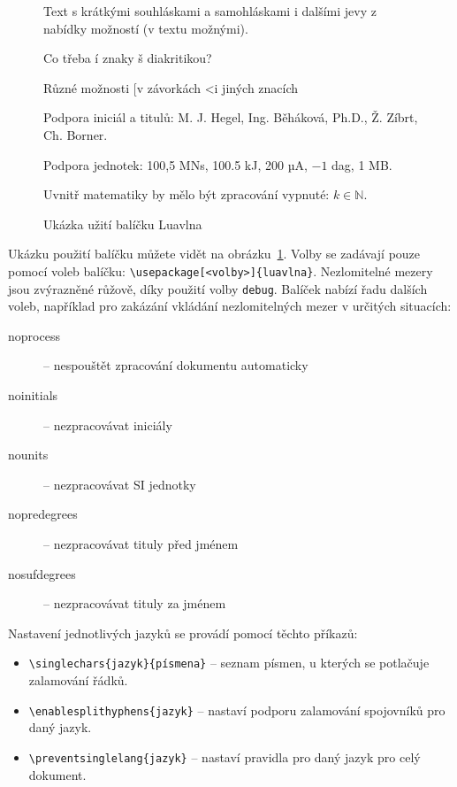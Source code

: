 \documentclass{csbulletin}
\begin{document}
\begin{figure}
  \begin{minipage}{3in}

    \preventsingledebugon

    Text s krátkými souhláskami a samohláskami i dalšími jevy
    z nabídky možností (v textu možnými).

    Co třeba í znaky š diakritikou?

    Různé možnosti [v závorkách \textless i jiných znacích

    Podpora iniciál a titulů: M. J. Hegel, Ing. Běháková, Ph.D., Ž. Zíbrt,
    Ch. Borner.

    Podpora jednotek: 100,5 MN\cdot{}s, 100.5 kJ, 200 µA, $-1$ dag, 1 MB. 

    Uvnitř matematiky by mělo být zpracování vypnuté: $k \in \mathbb N$.

    \preventsingledebugoff
  \end{minipage}
  \caption{Ukázka užití balíčku Luavlna}\label{fig:luavlna}
\end{figure}

Ukázku použití balíčku můžete vidět na obrázku~\ref{fig:luavlna}. 
Volby se zadávají pouze pomocí voleb balíčku: \verb|\usepackage[<volby>]{luavlna}|.
Nezlomitelné mezery jsou zvýrazněné růžově, díky použití volby \texttt{debug}. Balíček
nabízí řadu dalších voleb, například pro zakázání vkládání nezlomitelných 
mezer v určitých situacích:

\begin{description}
  \item [noprocess] – nespouštět zpracování dokumentu automaticky
  \item [noinitials] – nezpracovávat iniciály
  \item [nounits] – nezpracovávat SI jednotky
  \item [nopredegrees] – nezpracovávat tituly před jménem
  \item [nosufdegrees] – nezpracovávat tituly za jménem
\end{description}

Nastavení jednotlivých jazyků se provádí pomocí těchto příkazů:

  \begin{itemize}
    \item\verb|\singlechars{jazyk}{písmena}| – seznam písmen, u kterých se potlačuje zalamování řádků.

    \item\verb|\enablesplithyphens{jazyk}| –  nastaví podporu zalamování spojovníků pro daný jazyk.
    \item\verb|\preventsinglelang{jazyk}| – nastaví pravidla pro daný jazyk pro celý dokument.
  \end{itemize}
\end{document}
